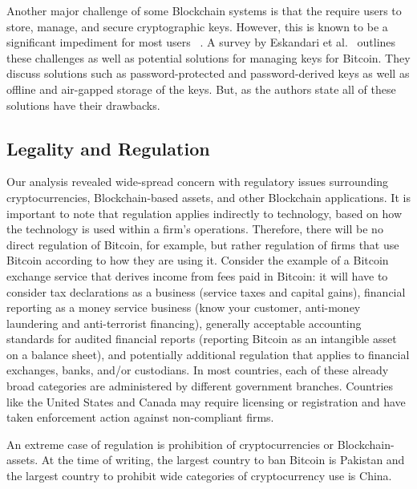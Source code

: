 Another major challenge of some Blockchain systems is that the require users to store, manage, and secure cryptographic keys. However, this is known to be a significant impediment for most users ~\cite{uss:WhiTyg99}.  A survey by Eskandari et al.~\cite{EBSC15} outlines these challenges as well as potential solutions for managing keys for Bitcoin.  They discuss solutions such as password-protected and password-derived keys as well as offline and air-gapped storage of the keys.  But, as the authors state all of these solutions have their drawbacks.


\subsection{Legality and Regulation}
Our analysis revealed wide-spread concern with regulatory issues surrounding cryptocurrencies, Blockchain-based assets, and other Blockchain applications. It is important to note that regulation applies indirectly to technology, based on how the technology is used within a firm's operations. Therefore, there will be no direct regulation of Bitcoin, for example, but rather regulation of firms that use Bitcoin according to how they are using it. Consider the example of a Bitcoin exchange service that derives income from fees paid in Bitcoin: it will have to consider tax declarations as a business (\eg service taxes and capital gains), financial reporting as a money service business (\eg know your customer, anti-money laundering and anti-terrorist financing), generally acceptable accounting standards for audited financial reports (\eg reporting Bitcoin as an intangible asset on a balance sheet), and potentially additional regulation that applies to financial exchanges, banks, and/or custodians. In most countries, each of these already broad categories are administered by different government branches. Countries like the United States and Canada may require licensing or registration and have taken enforcement action against non-compliant firms.

An extreme case of regulation is prohibition of cryptocurrencies or Blockchain-assets. At the time of writing, the largest country to ban Bitcoin is Pakistan and the largest country to prohibit wide categories of cryptocurrency use is China.
 
